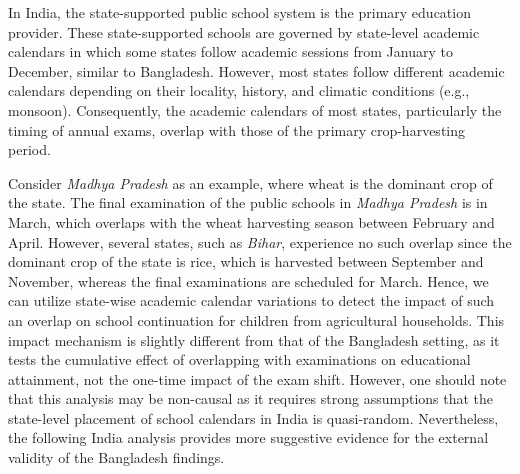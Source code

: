 \documentclass[12pt,letterpaper]{article}\usepackage[margin=1in]{geometry}
\newcommand{\0}{\ensuremath{\mbox{\boldmath $0$}}}
\begin{document}
In India, the state-supported public school system is the primary education provider. These state-supported schools are governed by state-level academic calendars in which some states follow academic sessions from January to December, similar to Bangladesh. However, most states follow different academic calendars depending on their locality, history, and climatic conditions (e.g., monsoon). Consequently, the academic calendars of most states, particularly the timing of annual exams, overlap with those of the primary crop-harvesting period. 

Consider \textit{Madhya Pradesh} as an example, where wheat is the dominant crop of the state. The final examination of the public schools in \textit{Madhya Pradesh} is in March, which overlaps with the wheat harvesting season between February and April. However, several states, such as \textit{Bihar}, experience no such overlap since the dominant crop of the state is rice, which is harvested between September and November, whereas the final examinations are scheduled for March. Hence, we can utilize state-wise academic calendar variations to detect the impact of such an overlap on school continuation for children from agricultural households. This impact mechanism is slightly different from that of the Bangladesh setting, as it tests the cumulative effect of overlapping with examinations on educational attainment, not the one-time impact of the exam shift. However, one should note that this analysis may be non-causal as it requires strong assumptions that the state-level placement of school calendars in India is quasi-random. Nevertheless, the following India analysis provides more suggestive evidence for the external validity of the Bangladesh findings. 
\end{document}
